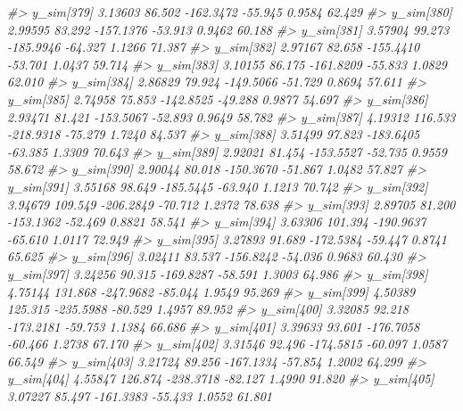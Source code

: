 \documentclass[
  10pt,
  italian,
  a4paper,
  extrafontsizes,onecolumn,openright
  ]{memoir}
\newenvironment{Shaded}{\begin{snugshade}}{\end{snugshade}}
\newcommand{\CommentTok}[1]{\textcolor[rgb]{0.56,0.35,0.01}{\textit{#1}}}
\begin{document}
\begin{Shaded}
\begin{Highlighting}[]
\CommentTok{\#\textgreater{}   y\_sim[379]  3.13603  86.502 {-}162.3472 {-}55.945  0.9584  62.429}
\CommentTok{\#\textgreater{}   y\_sim[380]  2.99595  83.292 {-}157.1376 {-}53.913  0.9462  60.188}
\CommentTok{\#\textgreater{}   y\_sim[381]  3.57904  99.273 {-}185.9946 {-}64.327  1.1266  71.387}
\CommentTok{\#\textgreater{}   y\_sim[382]  2.97167  82.658 {-}155.4410 {-}53.701  1.0437  59.714}
\CommentTok{\#\textgreater{}   y\_sim[383]  3.10155  86.175 {-}161.8209 {-}55.833  1.0829  62.010}
\CommentTok{\#\textgreater{}   y\_sim[384]  2.86829  79.924 {-}149.5066 {-}51.729  0.8694  57.611}
\CommentTok{\#\textgreater{}   y\_sim[385]  2.74958  75.853 {-}142.8525 {-}49.288  0.9877  54.697}
\CommentTok{\#\textgreater{}   y\_sim[386]  2.93471  81.421 {-}153.5067 {-}52.893  0.9649  58.782}
\CommentTok{\#\textgreater{}   y\_sim[387]  4.19312 116.533 {-}218.9318 {-}75.279  1.7240  84.537}
\CommentTok{\#\textgreater{}   y\_sim[388]  3.51499  97.823 {-}183.6405 {-}63.385  1.3309  70.643}
\CommentTok{\#\textgreater{}   y\_sim[389]  2.92021  81.454 {-}153.5527 {-}52.735  0.9559  58.672}
\CommentTok{\#\textgreater{}   y\_sim[390]  2.90044  80.018 {-}150.3670 {-}51.867  1.0482  57.827}
\CommentTok{\#\textgreater{}   y\_sim[391]  3.55168  98.649 {-}185.5445 {-}63.940  1.1213  70.742}
\CommentTok{\#\textgreater{}   y\_sim[392]  3.94679 109.549 {-}206.2849 {-}70.712  1.2372  78.638}
\CommentTok{\#\textgreater{}   y\_sim[393]  2.89705  81.200 {-}153.1362 {-}52.469  0.8821  58.541}
\CommentTok{\#\textgreater{}   y\_sim[394]  3.63306 101.394 {-}190.9637 {-}65.610  1.0117  72.949}
\CommentTok{\#\textgreater{}   y\_sim[395]  3.27893  91.689 {-}172.5384 {-}59.447  0.8741  65.625}
\CommentTok{\#\textgreater{}   y\_sim[396]  3.02411  83.537 {-}156.8242 {-}54.036  0.9683  60.430}
\CommentTok{\#\textgreater{}   y\_sim[397]  3.24256  90.315 {-}169.8287 {-}58.591  1.3003  64.986}
\CommentTok{\#\textgreater{}   y\_sim[398]  4.75144 131.868 {-}247.9682 {-}85.044  1.9549  95.269}
\CommentTok{\#\textgreater{}   y\_sim[399]  4.50389 125.315 {-}235.5988 {-}80.529  1.4957  89.952}
\CommentTok{\#\textgreater{}   y\_sim[400]  3.32085  92.218 {-}173.2181 {-}59.753  1.1384  66.686}
\CommentTok{\#\textgreater{}   y\_sim[401]  3.39633  93.601 {-}176.7058 {-}60.466  1.2738  67.170}
\CommentTok{\#\textgreater{}   y\_sim[402]  3.31546  92.496 {-}174.5815 {-}60.097  1.0587  66.549}
\CommentTok{\#\textgreater{}   y\_sim[403]  3.21724  89.256 {-}167.1334 {-}57.854  1.2002  64.299}
\CommentTok{\#\textgreater{}   y\_sim[404]  4.55847 126.874 {-}238.3718 {-}82.127  1.4990  91.820}
\CommentTok{\#\textgreater{}   y\_sim[405]  3.07227  85.497 {-}161.3383 {-}55.433  1.0552  61.801}

\end{Highlighting}
\end{Shaded}
\end{document}
